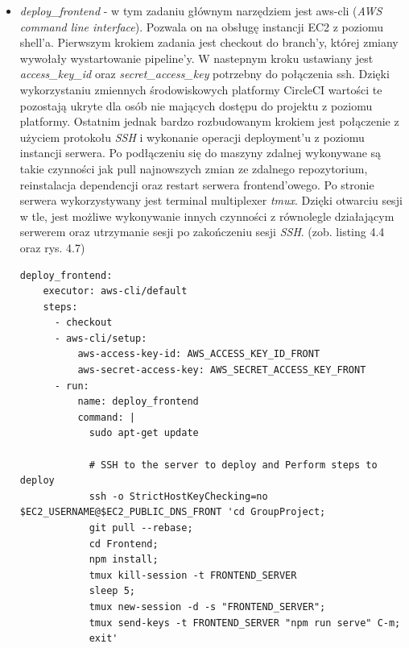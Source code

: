 \begin{itemize}
\newpage
	\item \textit{deploy\_frontend} - w tym zadaniu głównym narzędziem jest aws-cli (\textit{AWS command line interface}). Pozwala on na obsługę instancji EC2 z poziomu shell'a. Pierwszym krokiem zadania jest checkout do branch'y, której zmiany wywołały wystartowanie pipeline'y. W nastepnym kroku ustawiany jest \textit{access\_key\_id} oraz \textit{secret\_access\_key} potrzebny do połączenia ssh. Dzięki wykorzystaniu zmiennych środowiskowych platformy CircleCI wartości te pozostają ukryte dla osób nie mających dostępu do projektu z poziomu platformy. Ostatnim jednak bardzo rozbudowanym krokiem jest połączenie z użyciem protokołu \textit{SSH} i wykonanie operacji deployment'u z poziomu instancji serwera. Po podłączeniu się do maszyny zdalnej wykonywane są takie czynności jak pull najnowszych zmian ze zdalnego repozytorium, reinstalacja dependencji oraz restart serwera frontend'owego. Po stronie serwera wykorzystywany jest terminal multiplexer \textit{tmux}. Dzięki otwarciu sesji w tle, jest możliwe wykonywanie innych czynności z równolegle działającym serwerem oraz utrzymanie sesji po zakończeniu sesji \textit{SSH}. (zob. listing 4.4 oraz rys. 4.7)
\begin{lstlisting}[caption=Część skryptu config.yml odpowiadająca za wykonanie zadania \textit{deploy\_frontend}.]
deploy_frontend:
    executor: aws-cli/default
    steps:
      - checkout
      - aws-cli/setup:
          aws-access-key-id: AWS_ACCESS_KEY_ID_FRONT
          aws-secret-access-key: AWS_SECRET_ACCESS_KEY_FRONT
      - run:
          name: deploy_frontend
          command: |
            sudo apt-get update

            # SSH to the server to deploy and Perform steps to deploy
            ssh -o StrictHostKeyChecking=no $EC2_USERNAME@$EC2_PUBLIC_DNS_FRONT 'cd GroupProject; 
            git pull --rebase;
            cd Frontend;
            npm install;
            tmux kill-session -t FRONTEND_SERVER
            sleep 5;
            tmux new-session -d -s "FRONTEND_SERVER";
            tmux send-keys -t FRONTEND_SERVER "npm run serve" C-m;
            exit'


\end{lstlisting}
\end{itemize}
